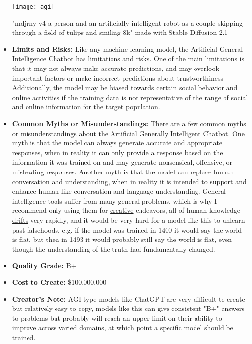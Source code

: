 \begin{itemize}
\begin{marginfigure}[-5.5cm]
        \texttt{[image: agi]}
        \caption{"mdjrny-v4 a person and an artificially intelligent robot as a couple skipping through a field of tulips and smiling 8k" made with Stable Diffusion 2.1}
\end{marginfigure}
    \item \textbf{Limits and Risks:} Like any machine learning model, the Artificial General Intelligence Chatbot has limitations and risks. One of the main limitations is that it may not always make accurate predictions, and may overlook important factors or make incorrect predictions about trustworthiness. Additionally, the model may be biased towards certain social behavior and online activities if the training data is not representative of the range of social and online information for the target population.
    \item \textbf{Common Myths or Misunderstandings:} There are a few common myths or misunderstandings about the Artificial Generally Intelligent Chatbot. One myth is that the model can always generate accurate and appropriate responses, when in reality it can only provide a response based on the information it was trained on and may generate nonsensical, offensive, or misleading responses. Another myth is that the model can replace human conversation and understanding, when in reality it is intended to support and enhance human-like conversation and language understanding. General intelligence tools suffer from many general problems, which is why I recommend only using them for \hyperref[sec:creative]{creative} endeavors, all of human knowledge \hyperref[sec:drift]{drifts} very rapidly, and it would be very hard for a model like this to unlearn past falsehoods, e.g. if the model was trained in 1400 it would say the world is flat, but then in 1493 it would probably still say the world is flat, even though the understanding of the truth had fundamentally changed. 
    \item \textbf{Quality Grade:} B+
    \item \textbf{Cost to Create:} \$100,000,000
    \item \textbf{Creator's Note:} AGI-type models like ChatGPT are very difficult to create but relatively easy to copy, models like this can give consistent "B+" answers to problems but probably will reach an upper limit on their ability to improve across varied domains, at which point a specific model should be trained.
\end{itemize}

